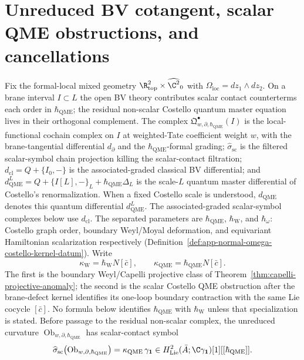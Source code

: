 \section{Unreduced BV cotangent, scalar QME obstructions, and cancellations}
\label{sec:app-unreduced-bv-qme}

Fix the formal-local mixed geometry
\(\R^2_{\mathrm{top}}\times\widehat{\C^2}_0\) with
\(\Omega_{\mathrm{loc}}=dz_1\wedge dz_2\).  On a brane interval
\(I\subset L\) the open BV theory contributes scalar contact
counterterms each order in \(\hbar_{\mathrm{QME}}\); the residual non-scalar Costello
quantum master equation lives in their orthogonal complement.  The
complex \(\mathfrak Q^\bullet_{w,\partial,\hbar_{\mathrm{QME}}}(I)\) is the
local-functional cochain complex on \(I\) at weighted-Tate coefficient
weight \(w\), with the brane-tangential differential
\(d_\partial\) and the \(\hbar_{\mathrm{QME}}\)-formal grading;
\(\widehat\sigma_{\mathrm{sc}}\) is the filtered scalar-symbol chain
projection killing the scalar-contact filtration;
\(d_{\mathrm{cl}}=Q+\{I_0,-\}\) is the associated-graded classical
BV differential; and
\(d_{\mathrm{QME}}^{L}=Q+\{I[L],-\}_{L}+\hbar_{\mathrm{QME}}\Delta_{L}\) is the
scale-\(L\) quantum master differential of Costello's renormalization.
When a fixed Costello scale is understood, \(d_{\mathrm{QME}}\) denotes
this quantum differential \(d_{\mathrm{QME}}^{L}\).  The
associated-graded scalar-symbol complexes below use \(d_{\mathrm{cl}}\).
The separated parameters are
\(\hbar_{\mathrm{QME}}\), \(\hbar_{\mathrm{W}}\), and \(\hbar_\omega\):
Costello graph order, boundary Weyl/Moyal deformation, and equivariant
Hamiltonian scalarization respectively
(Definition~\ref{def:app-normal-omega-costello-kernel-datum}).  Write
\[
  \kappa_{\mathrm{W}}=\hbar_{\mathrm{W}}N[\bar c],
  \qquad
  \kappa_{\mathrm{QME}}=\hbar_{\mathrm{QME}}N[\bar c].
\]
The first is the boundary Weyl/Capelli projective class of
Theorem~\ref{thm:capelli-projective-anomaly}; the second is the scalar
Costello QME obstruction after the brane-defect kernel identifies its
one-loop boundary contraction with the same Lie cocycle \([\bar c]\).
No formula below identifies \(\hbar_{\mathrm{QME}}\) with
\(\hbar_{\mathrm{W}}\) unless that specialization is stated.
Before passage to the
residual non-scalar complex, the unreduced curvature
\(\operatorname{Ob}_{w,\partial,\hbar_{\mathrm{QME}}}\) has scalar-contact symbol
\[
  \widehat\sigma_{\mathrm{sc}}\bigl(
    \operatorname{Ob}_{w,\partial,\hbar_{\mathrm{QME}}}\bigr)
    =\kappa_{\mathrm{QME}}\,\gamma_{\mathbf 1}
    \in H^2_{\mathrm{Lie}}(\bar A;\C\gamma_{\mathbf 1})[1]
       [[\hbar_{\mathrm{QME}}]].
\]
